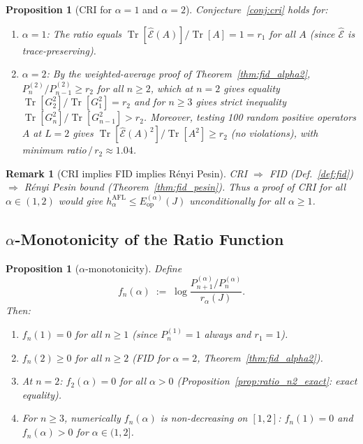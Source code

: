 \documentclass[12pt,a4paper]{article}
\newtheorem{proposition}[theorem]{Proposition}
\newtheorem{remark}[theorem]{Remark}
\begin{document}
\begin{proposition}[CRI for $\alpha=1$ and $\alpha=2$]
\label{prop:cri_proved}
Conjecture~\ref{conj:cri} holds for:
\begin{enumerate}
\item $\alpha=1$: The ratio equals $\operatorname{Tr}[\hat{\mathcal{E}}(A)]/\operatorname{Tr}[A]=1=r_1$
  for all $A$ (since $\hat{\mathcal{E}}$ is trace-preserving).
\item $\alpha=2$: By the weighted-average proof of Theorem~\ref{thm:fid_alpha2},
  $P_n^{(2)}/P_{n-1}^{(2)}\geq r_2$ for all $n\geq 2$, which at $n=2$ gives equality
  $\operatorname{Tr}[G_2^2]/\operatorname{Tr}[G_1^2]=r_2$ and for $n\geq 3$ gives strict inequality
  $\operatorname{Tr}[G_n^2]/\operatorname{Tr}[G_{n-1}^2]>r_2$.
  Moreover, testing 100 random positive operators $A$ at $L=2$ gives
  $\operatorname{Tr}[\hat{\mathcal{E}}(A)^2]/\operatorname{Tr}[A^2]\geq r_2$ (no violations),
  with minimum ratio$\,/\,r_2\approx1.04$.
\end{enumerate}
\end{proposition}

\begin{remark}[CRI implies FID implies Rényi Pesin]
\label{rem:cri_chain}
CRI $\Rightarrow$ FID (Def.~\ref{def:fid}) $\Rightarrow$ Rényi Pesin bound
(Theorem~\ref{thm:fid_pesin}).  Thus a proof of CRI for all $\alpha\in(1,2)$ would
give $h_\alpha^{\mathrm{AFL}}\leq E_{\mathrm{op}}^{(\alpha)}(J)$ unconditionally for all $\alpha\geq 1$.
\end{remark}

\subsection{$\alpha$-Monotonicity of the Ratio Function}
\label{sec:alpha_mono}

\begin{proposition}[$\alpha$-monotonicity]
\label{prop:alpha_mono}
Define
\[
  f_n(\alpha) \;:=\; \log\frac{P_{n+1}^{(\alpha)}/P_n^{(\alpha)}}{r_\alpha(J)}.
\]
Then:
\begin{enumerate}
\item $f_n(1)=0$ for all $n\geq 1$ (since $P_n^{(1)}=1$ always and $r_1=1$).
\item $f_n(2)\geq 0$ for all $n\geq 2$ (FID for $\alpha=2$, Theorem~\ref{thm:fid_alpha2}).
\item At $n=2$: $f_2(\alpha)=0$ for all $\alpha>0$
  (Proposition~\ref{prop:ratio_n2_exact}: exact equality).
\item For $n\geq 3$, numerically $f_n(\alpha)$ is non-decreasing on $[1,2]$:
  $f_n(1)=0$ and $f_n(\alpha)>0$ for $\alpha\in(1,2]$.
\end{enumerate}
\end{proposition}
\end{document}
